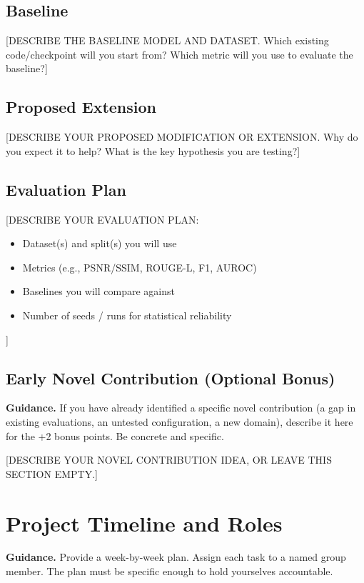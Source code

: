 \documentclass[11pt, letterpaper]{article}
\begin{document}
\subsection{Baseline}

[DESCRIBE THE BASELINE MODEL AND DATASET. Which existing code/checkpoint will
you start from? Which metric will you use to evaluate the baseline?]

\subsection{Proposed Extension}

[DESCRIBE YOUR PROPOSED MODIFICATION OR EXTENSION. Why do you expect it to
help? What is the key hypothesis you are testing?]

\subsection{Evaluation Plan}

[DESCRIBE YOUR EVALUATION PLAN:
\begin{itemize}[noitemsep]
  \item Dataset(s) and split(s) you will use
  \item Metrics (e.g., PSNR/SSIM, ROUGE-L, F1, AUROC)
  \item Baselines you will compare against
  \item Number of seeds / runs for statistical reliability
\end{itemize}]

\subsection{Early Novel Contribution (Optional Bonus)}

\begin{guidancebox}
\textbf{Guidance.} If you have already identified a specific novel contribution
(a gap in existing evaluations, an untested configuration, a new domain),
describe it here for the +2 bonus points. Be concrete and specific.
\end{guidancebox}

[DESCRIBE YOUR NOVEL CONTRIBUTION IDEA, OR LEAVE THIS SECTION EMPTY.]

\section{Project Timeline and Roles}

\begin{guidancebox}
\textbf{Guidance.} Provide a week-by-week plan. Assign each task to a named
group member. The plan must be specific enough to hold yourselves accountable.
\end{guidancebox}
\end{document}
